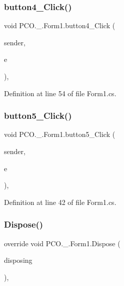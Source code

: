 \subsubsection{\texorpdfstring{button4\+\_\+\+Click()}{button4\_Click()}}
{\footnotesize\ttfamily void P\+C\+O.\+\_.\+Form1.\+button4\+\_\+\+Click (\begin{DoxyParamCaption}\item[{object}]{sender,  }\item[{Event\+Args}]{e }\end{DoxyParamCaption})\hspace{0.3cm}{\ttfamily [inline]}, {\ttfamily [private]}}



Definition at line 54 of file Form1.\+cs.

\mbox{\label{classPCO_1_1__0_1_1Form1_a6654d9632be04dacf3e2d4473f209a28}} 
\subsubsection{\texorpdfstring{button5\+\_\+\+Click()}{button5\_Click()}}
{\footnotesize\ttfamily void P\+C\+O.\+\_.\+Form1.\+button5\+\_\+\+Click (\begin{DoxyParamCaption}\item[{object}]{sender,  }\item[{Event\+Args}]{e }\end{DoxyParamCaption})\hspace{0.3cm}{\ttfamily [inline]}, {\ttfamily [private]}}



Definition at line 42 of file Form1.\+cs.

\mbox{\label{classPCO_1_1__0_1_1Form1_ad3d7e394a984eb802f4ce2bbda31ee62}} 
\subsubsection{\texorpdfstring{Dispose()}{Dispose()}}
{\footnotesize\ttfamily override void P\+C\+O.\+\_.\+Form1.\+Dispose (\begin{DoxyParamCaption}\item[{bool}]{disposing }\end{DoxyParamCaption})\hspace{0.3cm}{\ttfamily [inline]}, {\ttfamily [protected]}}



